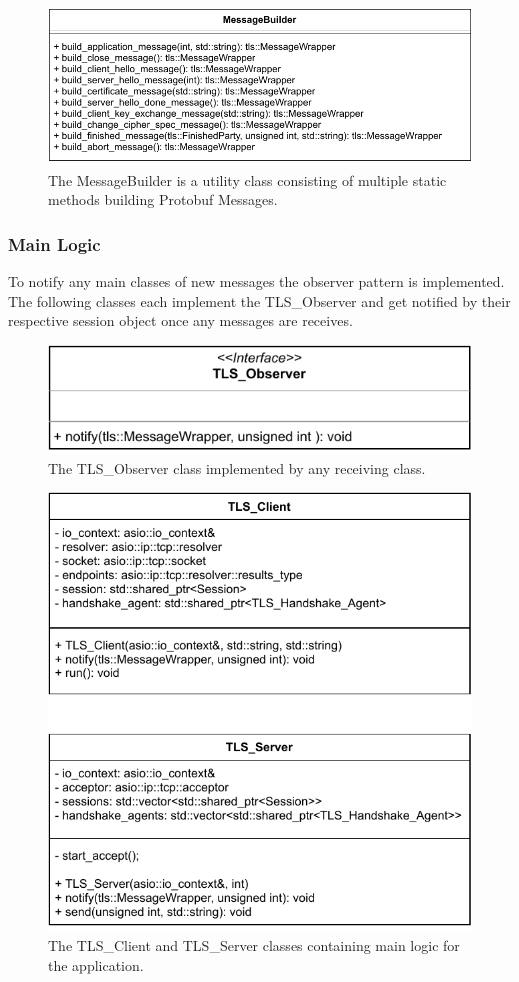 \documentclass[12pt, letterpaper]{article}
\begin{document}
\begin{figure}[H]
	\centering
	\includegraphics[width=.7\textwidth]{UML/Messagebuilder}
	\caption{The MessageBuilder is a utility class consisting of multiple static methods building Protobuf Messages.}
	\label{fig:Messagebuilder}
\end{figure}

\subsubsection{Main Logic}
To notify any main classes of new messages the observer pattern is implemented. The following classes each implement the TLS\_Observer and get notified by their respective session object once any messages are receives.

\begin{figure}[H]
	\centering
	\includegraphics[width=.7\textwidth]{UML/Observer}
	\caption{The TLS\_Observer class implemented by any receiving class.}
	\label{fig:Observer}
\end{figure}

\begin{figure}[H]
	\centering
	\includegraphics[width=.7\textwidth]{UML/ClientServer}
	\caption{The TLS\_Client and TLS\_Server classes containing main logic for the application.}
	\label{fig:ClientServer}
\end{figure}
\end{document}
